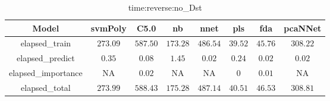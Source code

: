 \begin{table}[!ht]
	\centering
	\begin{tabular}{|c|c|c|c|c|c|c|c|}
		\hline
		Model & svmPoly & C5.0 & nb & nnet & pls & fda & pcaNNet \\ \hline
		elapsed_train & $273.09$ & $587.50$ & $173.28$ & $486.54$ & $39.52$ & $45.76$ & $308.22$ \\ \hline
		elapsed_predict & $0.35$ & $0.08$ & $1.45$ & $0.02$ & $0.24$ & $0.02$ & $0.02$ \\ \hline
		elapsed_importance & NA & $0.02$ & NA & NA & $0$ & $0.01$ & NA \\ \hline
		elapsed_total & $273.99$ & $588.43$ & $175.28$ & $487.14$ & $40.51$ & $46.53$ & $308.81$ \\ \hline
	\end{tabular}
	\caption{time:reverse:no_Dst}
	\label{tab:time:reverse:no_Dst}
\end{table}
